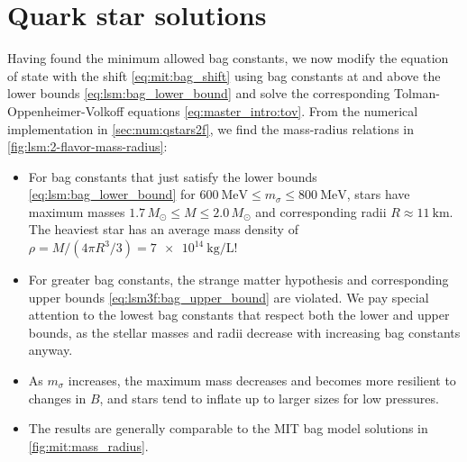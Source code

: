 \section{Quark star solutions}
\label{sec:lsm:stars}

Having found the minimum allowed bag constants,
we now modify the equation of state
with the shift \eqref{eq:mit:bag_shift}
using bag constants at and above the lower bounds \eqref{eq:lsm:bag_lower_bound}
and solve the corresponding Tolman-Oppenheimer-Volkoff equations \eqref{eq:master_intro:tov}.
From the numerical implementation in \cref{sec:num:qstars2f},
we find the mass-radius relations in \cref{fig:lsm:2-flavor-mass-radius}:
\begin{itemize}
\item For bag constants that just satisfy the lower bounds \eqref{eq:lsm:bag_lower_bound} for $\SI{600}{\mega\electronvolt} \leq m_\sigma \leq \SI{800}{\mega\electronvolt}$,
      stars have maximum masses $1.7 \, M_\odot \leq M \leq 2.0 \, M_\odot$ and corresponding radii $R \approx \SI{11}{\kilo\meter}$.
      The heaviest star has an average mass density of $\rho = M / (4 \pi R^3/3) = \SI{7e14}{\kilo\gram\per\liter}$!
\item For greater bag constants,
      the strange matter hypothesis and corresponding upper bounds \eqref{eq:lsm3f:bag_upper_bound}
      are violated.
      We pay special attention to the lowest bag constants that respect both the lower and upper bounds,
      as the stellar masses and radii decrease with increasing bag constants anyway.
\item As $m_\sigma$ increases,
      the maximum mass decreases and becomes more resilient to changes in $B$, and stars tend to inflate up to larger sizes for low pressures.
\item The results are generally comparable to the MIT bag model solutions in \cref{fig:mit:mass_radius}.
\end{itemize}

